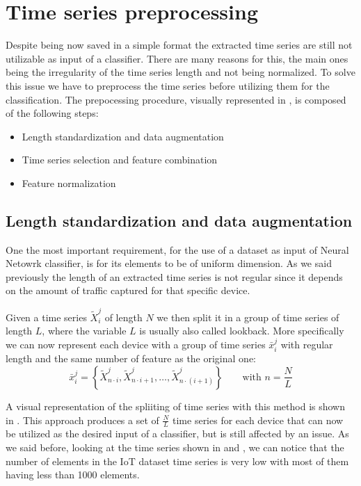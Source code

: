 \section{Time series preprocessing}

Despite being now saved in a simple format the extracted time series are still not utilizable as input of a classifier. There are many reasons for this, the main ones being the irregularity of the time series length and not being normalized. To solve this issue we have to preprocess the time series before utilizing them for the classification. 
The prepocessing procedure, visually represented in , is composed of the following steps:
\begin{itemize}[noitemsep]
    \item {Length standardization} and data augmentation
    \item Time series selection and feature combination
    \item Feature normalization
\end{itemize}

\subsection{Length standardization and data augmentation}

One the most important requirement, for the use of a dataset as input of Neural Netowrk classifier, is for its elements to be of uniform dimension. As we said previously the length of an extracted time series is not regular since it depends on the amount of traffic captured for that specific device.

Given a time series ${\tilde{X}_i^j}$ of length $N$ we then split it in a group of time series of length $L$, where the variable $L$ is usually also called lookback. More specifically we can now represent each device with a group of time series $\bar{x}_i^j$ with regular length and the same number of feature as the original one:
\begin{equation}
    \bar{x}_i^j = \left\{\tilde{X}_{n\cdot i}^j, \tilde{X}_{n\cdot i +1 }^j, \dots, \tilde{X}_{n\cdot(i+1)}^j  \right\}
    \qquad\text{with }n=\frac{N}{L}
\end{equation}

A visual representation of the spliiting of time series with this method is shown in . This approach produces a set of $\frac{N}{L}$ time series for each device that can now be utilized as the desired input of a classifier, but is still affected by an issue. As we said before, looking at the time series shown in  and , we can notice that the number of elements in the IoT dataset time series is very low with most of them having less than 1000 elements. 

